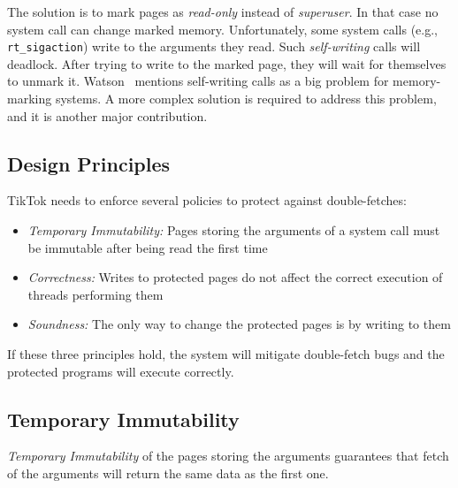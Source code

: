 \documentclass[conference]{IEEEtran}
\newcommand{\mat}[1]{\textcolor{red}{\textbf{Mat:} #1}}
\newcommand{\sysname}{TikTok}
\begin{document}
The solution is to mark pages as \emph{read-only} instead of \emph{superuser}.
In that case no system call can change marked memory. Unfortunately, some system
calls (e.g., \texttt{rt\_sigaction}) write to the arguments they read. Such
\emph{self-writing} calls will deadlock. After trying to write to the marked
page, they will wait for themselves to unmark it.
Watson~\cite{watson2007exploiting} mentions self-writing calls as a big problem
for memory-marking systems. A more complex solution is required to address this
problem, and it is another major contribution.

\subsection{Design Principles}
\label{subsec:designprinciples}
\sysname{} needs to enforce several policies to protect against double-fetches:

\begin{itemize}
  \item \label{policy:immutability} \emph{Temporary Immutability:} Pages storing
  the arguments of a system call must be immutable after being read the first
  time
  \item \label{policy:correctness} \emph{Correctness:} Writes to protected pages
  do not affect the correct execution of threads performing them
  \item \label{policy:soundness} \emph{Soundness:} The only way to change the
  protected pages is by writing to them
\end{itemize}

If these three principles hold, the system will mitigate double-fetch bugs and
the protected programs will execute correctly.

\subsection{Temporary Immutability}
\label{subsec:tempimmut}
\emph{Temporary Immutability} of the pages storing the arguments guarantees that
fetch of the arguments will return the same data as the first one.
\end{document}
